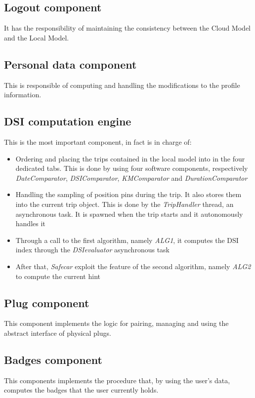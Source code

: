 \subsection{Logout component}
It has the responsibility of maintaining the consistency between the Cloud Model and the Local Model.

\subsection{Personal data component}
This is responsible of computing and handling the modifications to the profile information.

\subsection{DSI computation engine}
This is the most important component, in fact is in charge of:

\begin{itemize}
	\item Ordering and placing the trips contained in the local model into in the four dedicated tabs. This is done by using four software components, respectively \textit{DateComparator}, \textit{DSIComparator}, \textit{KMComparator} and \textit{DurationComparator}
	\item Handling the sampling of position pins during the trip. It also stores them into the current trip object. This is done by the \textit{TripHandler} thread, an asynchronous task. It is spawned when the trip starts and it autonomously handles it
	\item Through a call to the first algorithm, namely \textit{ALG1}, it computes the DSI index through the \textit{DSIevaluator} asynchronous task
	\item After that, \textit{Safecar} exploit the feature of the second algorithm, namely \textit{ALG2} to compute the current hint
\end{itemize}

\subsection{Plug component}
This component implements the logic for pairing, managing and using the abstract interface of physical plugs.

\subsection{Badges component}
This components implements the procedure that, by using the user's data, computes the badges that the user currently holds.

